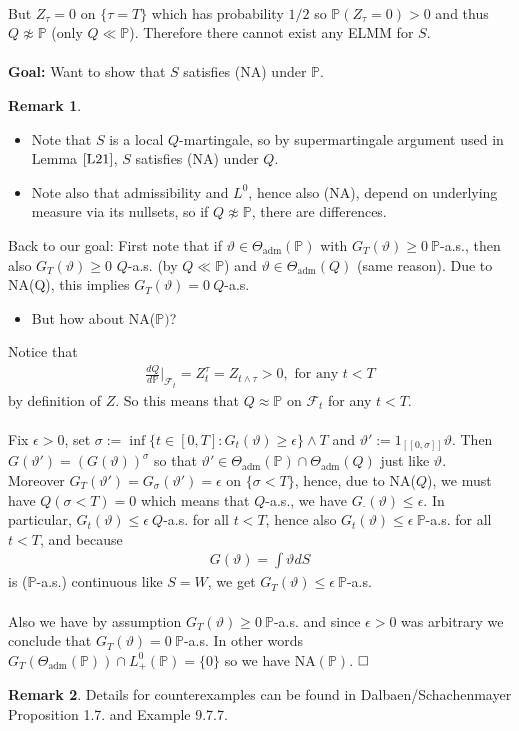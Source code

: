 \documentclass[12pt,a4paper, twoside]{article}
\theoremstyle{definition}
\newtheorem{rem}{Remark}[section]
\newcommand{\PP}{\mathbb{P}} %
\begin{document}
\\
But $Z_\tau = 0$ on $\{\tau = T\}$ which has probability $1/2$ so $\PP(Z_\tau =0)>0$ and thus $Q \not \approx \PP$ (only $Q \ll \PP$). Therefore there cannot exist any ELMM for $S$. 
\\\\
\textbf{Goal:} Want to show that $S$ satisfies (NA) under $\PP$. 
\begin{rem} \ \begin{itemize}
\item Note that $S$ is a local $Q$-martingale, so by supermartingale argument used in Lemma $\ref{L21}$, $S$ satisfies (NA) under $Q$. 
\item Note also that admissibility and $L^0$, hence also (NA), depend on underlying measure via its nullsets, so if $Q \not \approx \PP$, there are differences. 
\end{itemize}
\end{rem}
\newpage
Back to our goal: First note that if $\vartheta \in \Theta_\text{adm}(\PP)$ with $G_T( \vartheta) \geq 0 \ \PP$-a.s., then also $G_T( \vartheta) \geq 0$ $Q$-a.s. (by $Q \ll \PP$) and $\vartheta \in \Theta_\text{adm}(Q)$ (same reason). Due to NA(Q), this implies $G_T( \vartheta)=0 \ Q$-a.s.
\begin{itemize}
\item But how about NA($\PP)$?
\end{itemize}
Notice that 
\begin{align*}
\frac{dQ}{d \PP}\Big|_{ \mathcal{F}_t} = Z_t^\tau = Z_{t \wedge \tau} >0, \text{ for any } t < T
\end{align*}
by definition of $Z$. So this means that $Q \approx \PP$ on $\mathcal{F}_t$ for any $t < T$. \\
\\
Fix $\epsilon >0$, set $\sigma:= \inf \{ t  \in [0,T] : G_t( \vartheta) \geq \epsilon\} \wedge T$ and $\vartheta' := 1_{[\![0, \sigma]\!]} \vartheta$. Then $G( \vartheta')=( G( \vartheta))^\sigma$ so that $\vartheta' \in \Theta_\text{adm}(\PP) \cap \Theta_\text{adm}(Q)$ just like $\vartheta$.\\  Moreover $G_T( \vartheta') = G_\sigma( \vartheta') = \epsilon$ on $\{ \sigma < T \}$, hence, due to NA($Q$), we must have $Q( \sigma < T)=0$ which means that $Q$-a.s., we have $G_\cdot ( \vartheta) \leq \epsilon$. In particular, $G_t( \vartheta) \leq \epsilon \ Q$-a.s. for all $t<T$, hence also $G_t( \vartheta) \leq \epsilon \ \PP$-a.s. for all $t < T$, and because 
\begin{align*}
G( \vartheta) = \int \vartheta dS
\end{align*}
is ($\PP$-a.s.) continuous like $S=W$, we get $G_T( \vartheta) \leq \epsilon \ \PP$-a.s. \\
\\
Also we have by assumption $G_T( \vartheta) \geq 0 \ \PP$-a.s. and since $\epsilon >0$ was arbitrary we conclude that $G_T( \vartheta)=0 \ \PP$-a.s. In other words $G_T( \Theta_\text{adm}(\PP)) \cap L_+^0(\PP)= \{0 \}$ so we have NA$(\PP)$. $\hfill \Box$
\begin{rem} Details for counterexamples can be found in Dalbaen/Schachenmayer Proposition 1.7. and Example 9.7.7. 
\end{rem}
\newpage
\end{document}
